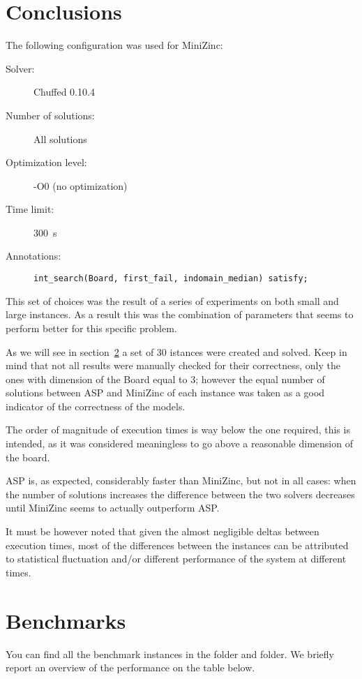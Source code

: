 \section{Conclusions}
The following configuration was used for MiniZinc:
\begin{description}
    \item[Solver: ] Chuffed 0.10.4
    \item[Number of solutions: ] All solutions
    \item[Optimization level: ] -O0 (no optimization)
    \item[Time limit: ] \SI{300}{s}
    \item[Annotations: ] \texttt{int_search(Board, first_fail, indomain_median) satisfy;}
\end{description}

This set of choices was the result of a series of experiments on both small and large instances. As a result this was the combination of parameters that seems to perform better for this specific problem.


As we will see in section~\ref{sec:benchmarks} a set of 30 istances were created and solved. Keep in mind that not all results were manually checked for their correctness, only the ones with dimension of the Board equal to 3; however the equal number of solutions between ASP and MiniZinc of each instance was taken as a good indicator of the correctness of the models.

The order of magnitude of execution times is way below the one required, this is intended, as it was considered meaningless to go above a reasonable dimension of the board.

ASP is, as expected, considerably faster than MiniZinc, but not in all cases: when the number of solutions increases the difference between the two solvers decreases until MiniZinc seems to actually outperform ASP. 

It must be however noted that given the almost negligible deltas between execution times, most of the differences between the instances can be attributed to statistical fluctuation and/or different performance of the system at different times.

\section{Benchmarks}\label{sec:benchmarks}
You can find all the benchmark instances in the  folder and  folder. We briefly report an overview of the performance on the table below.

